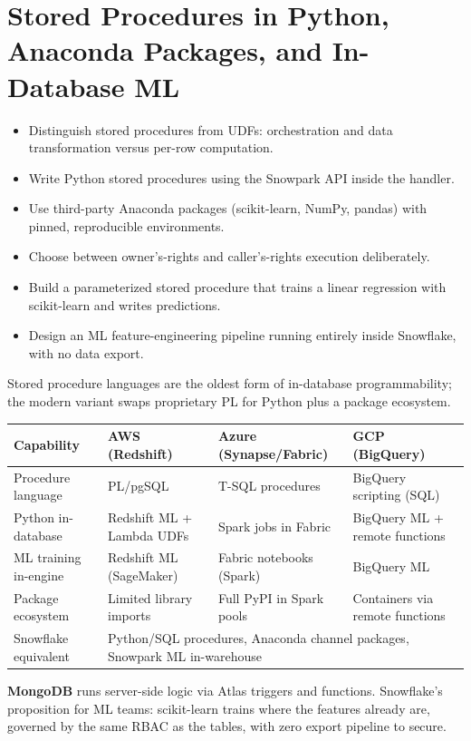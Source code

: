 \chapter{Stored Procedures in Python, Anaconda Packages, and In-Database ML}
%
\begin{objectives}
\begin{itemize}
    \item Distinguish stored procedures from UDFs: orchestration and data transformation versus per-row computation.
    \item Write Python stored procedures using the Snowpark API inside the handler.
    \item Use third-party Anaconda packages (scikit-learn, NumPy, pandas) with pinned, reproducible environments.
    \item Choose between owner's-rights and caller's-rights execution deliberately.
    \item Build a parameterized stored procedure that trains a linear regression with scikit-learn and writes predictions.
    \item Design an ML feature-engineering pipeline running entirely inside Snowflake, with no data export.
\end{itemize}
\end{objectives}

\begin{crosscloud}
Stored procedure languages are the oldest form of in-database programmability; the modern variant swaps proprietary PL for Python plus a package ecosystem.

\vspace{2mm}
{\footnotesize
\begin{tabular}{@{}p{2.8cm}p{3.0cm}p{3.0cm}p{3.0cm}@{}}
\toprule
\textbf{Capability} & \textbf{AWS (Redshift)} & \textbf{Azure (Synapse/Fabric)} & \textbf{GCP (BigQuery)} \\
\midrule
Procedure language & PL/pgSQL & T-SQL procedures & BigQuery scripting (SQL) \\
Python in-database & Redshift ML + Lambda UDFs & Spark jobs in Fabric & BigQuery ML + remote functions \\
ML training in-engine & Redshift ML (SageMaker) & Fabric notebooks (Spark) & BigQuery ML \\
Package ecosystem & Limited library imports & Full PyPI in Spark pools & Containers via remote functions \\
\addlinespace
Snowflake equivalent & \multicolumn{3}{l}{Python/SQL procedures, Anaconda channel packages, Snowpark ML in-warehouse} \\
\bottomrule
\end{tabular}}

\vspace{1mm}
\textbf{MongoDB} runs server-side logic via Atlas triggers and functions. Snowflake's proposition for ML teams: scikit-learn trains where the features already are, governed by the same RBAC as the tables, with zero export pipeline to secure.
\end{crosscloud}

